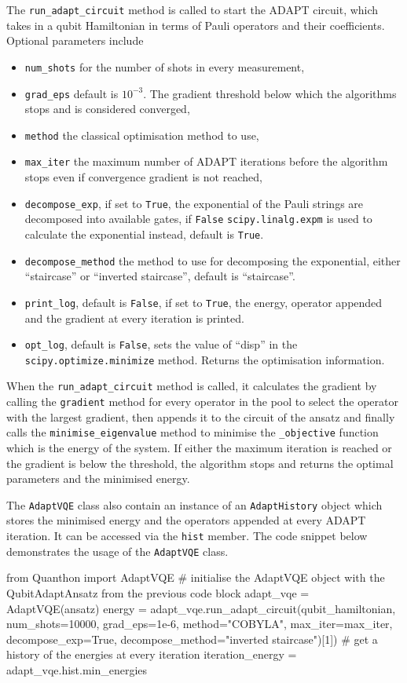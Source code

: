 The \texttt{run\_adapt\_circuit} method is called to start the ADAPT circuit, which takes in a qubit Hamiltonian in terms of Pauli operators and their coefficients. Optional parameters include 
\begin{itemize}
	\item \texttt{num\_shots} for the number of shots in every measurement, 
	\item \texttt{grad\_eps} default is $10^{-3}$. The gradient threshold below which the algorithms stops and is considered converged, 
	\item \texttt{method} the classical optimisation method to use,
	\item \texttt{max\_iter} the maximum number of ADAPT iterations before the algorithm stops even if convergence gradient is not reached,
	\item \texttt{decompose\_exp}, if set to \texttt{True}, the exponential of the Pauli strings are decomposed into available gates, if \texttt{False} \texttt{scipy.linalg.expm} is used to calculate the exponential instead, default is \texttt{True}.
	\item \texttt{decompose\_method} the method to use for decomposing the exponential, either ``staircase'' or ``inverted staircase'', default is ``staircase''. 
	\item \texttt{print\_log}, default is \texttt{False}, if set to \texttt{True}, the energy, operator appended and the gradient at every iteration is printed.
	\item \texttt{opt\_log}, default is \texttt{False}, sets the value of ``disp'' in the \texttt{scipy.optimize.minimize} method. Returns the optimisation information.

\end{itemize}
When the \texttt{run\_adapt\_circuit} method is called, it calculates the gradient by calling the \texttt{gradient} method for every operator in the pool to select the operator with the largest gradient, then appends it to the circuit of the ansatz and finally calls the \texttt{minimise\_eigenvalue} method to minimise the \texttt{\_objective} function which is the energy of the system. If either the maximum iteration is reached or the gradient is below the threshold, the algorithm stops and returns the optimal parameters and the minimised energy.


The \texttt{AdaptVQE} class also contain an instance of an \texttt{AdaptHistory} object which stores the minimised energy and the operators appended at every ADAPT iteration. It can be accessed via the \texttt{hist} member.
The code snippet below demonstrates the usage of the \texttt{AdaptVQE} class.
\begin{mycode}
	from Quanthon import AdaptVQE
	# initialise the AdaptVQE object with the QubitAdaptAnsatz from the previous code block
	adapt_vqe = AdaptVQE(ansatz)
	energy = adapt_vqe.run_adapt_circuit(qubit_hamiltonian, 
					     num_shots=10000,
					     grad_eps=1e-6, 
					     method="COBYLA", 
					     max_iter=max_iter, 
					     decompose_exp=True,
					     decompose_method="inverted staircase")[1])
	# get a history of the energies at every iteration
	iteration_energy = adapt_vqe.hist.min_energies 
\end{mycode}


